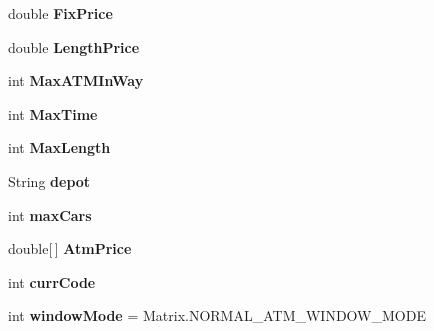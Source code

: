 \begin{DoxyCompactItemize}
\item 
double {\bfseries Fix\+Price}\hypertarget{classheneticmethod_1_1_matrix_ab2c239a50abbcc662456eb2dc3aa59dd}{}\label{classheneticmethod_1_1_matrix_ab2c239a50abbcc662456eb2dc3aa59dd}

\item 
double {\bfseries Length\+Price}\hypertarget{classheneticmethod_1_1_matrix_aac0e7de1922fa4b7a1759d18f9ad7a95}{}\label{classheneticmethod_1_1_matrix_aac0e7de1922fa4b7a1759d18f9ad7a95}

\item 
int {\bfseries Max\+A\+T\+M\+In\+Way}\hypertarget{classheneticmethod_1_1_matrix_af8aa68664be4d796ea5355193d8b5333}{}\label{classheneticmethod_1_1_matrix_af8aa68664be4d796ea5355193d8b5333}

\item 
int {\bfseries Max\+Time}\hypertarget{classheneticmethod_1_1_matrix_a2aa0c59679224c196b4480c9f6ec8065}{}\label{classheneticmethod_1_1_matrix_a2aa0c59679224c196b4480c9f6ec8065}

\item 
int {\bfseries Max\+Length}\hypertarget{classheneticmethod_1_1_matrix_abfc5591a662877b2e88417cac5109a87}{}\label{classheneticmethod_1_1_matrix_abfc5591a662877b2e88417cac5109a87}

\item 
String {\bfseries depot}\hypertarget{classheneticmethod_1_1_matrix_a0c83fa2993121ea2f45a9e5302397c2d}{}\label{classheneticmethod_1_1_matrix_a0c83fa2993121ea2f45a9e5302397c2d}

\item 
int {\bfseries max\+Cars}\hypertarget{classheneticmethod_1_1_matrix_a12b82868ca6e1bc5ab4a11df342c3222}{}\label{classheneticmethod_1_1_matrix_a12b82868ca6e1bc5ab4a11df342c3222}

\item 
double\mbox{[}$\,$\mbox{]} {\bfseries Atm\+Price}\hypertarget{classheneticmethod_1_1_matrix_aa4205a765c749e8737592e1163699e1d}{}\label{classheneticmethod_1_1_matrix_aa4205a765c749e8737592e1163699e1d}

\item 
int {\bfseries curr\+Code}\hypertarget{classheneticmethod_1_1_matrix_a7516af27ea8eb351d90dc073e196840a}{}\label{classheneticmethod_1_1_matrix_a7516af27ea8eb351d90dc073e196840a}

\item 
int {\bfseries window\+Mode} = Matrix.\+N\+O\+R\+M\+A\+L\+\_\+\+A\+T\+M\+\_\+\+W\+I\+N\+D\+O\+W\+\_\+\+M\+O\+DE\hypertarget{classheneticmethod_1_1_matrix_ade2de43b3340a9a4c05332ffd1c090a6}{}\label{classheneticmethod_1_1_matrix_ade2de43b3340a9a4c05332ffd1c090a6}


\end{DoxyCompactItemize}
